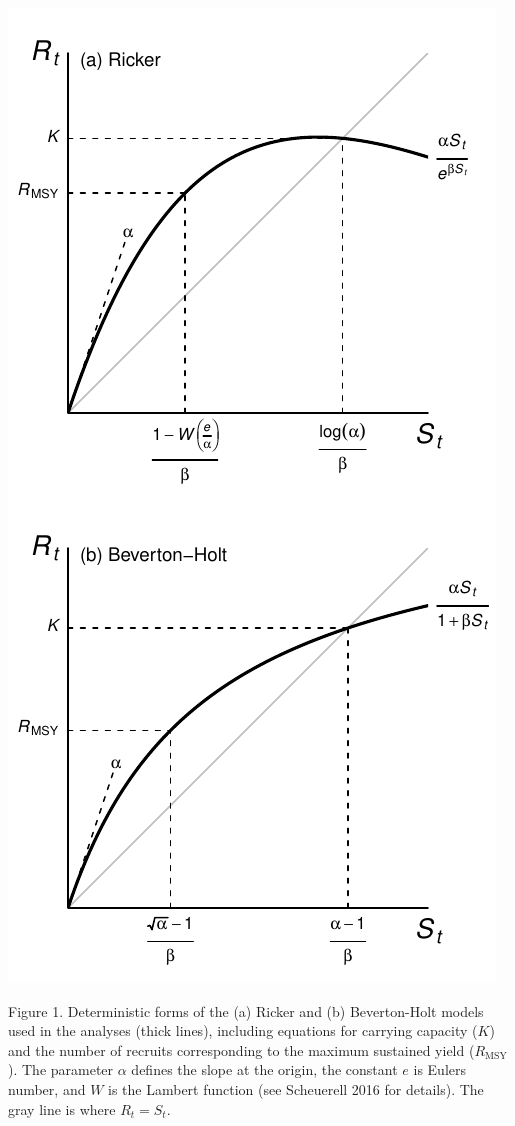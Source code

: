 \documentclass[11pt,]{article}
\begin{document}
\begin{center}\includegraphics{App_3_Summarize_results_files/figure-latex/fig_1_model_forms-1} \end{center}

Figure 1. Deterministic forms of the (a) Ricker and (b) Beverton-Holt
models used in the analyses (thick lines), including equations for
carrying capacity (\(K\)) and the number of recruits corresponding to
the maximum sustained yield (\(R_{\text{MSY}}\)). The parameter
\(\alpha\) defines the slope at the origin, the constant \(e\) is Eulers
number, and \(W\) is the Lambert function (see Scheuerell 2016 for
details). The gray line is where \(R_t = S_t\).
\end{document}
